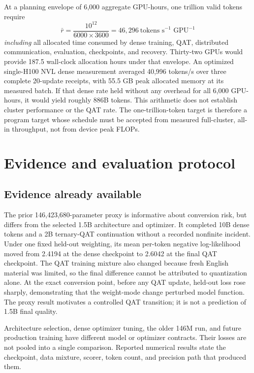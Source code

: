 \documentclass[11pt]{article}
\begin{document}
At a planning envelope of 6,000 aggregate GPU-hours, one trillion valid
tokens require
\begin{equation}
\bar r=\frac{10^{12}}{6000\times3600}
=46{,}296\ \text{tokens s}^{-1}\text{ GPU}^{-1}
\end{equation}
\emph{including} all allocated time consumed by dense training, QAT,
distributed communication, evaluation, checkpoints, and recovery. Thirty-two
GPUs would provide 187.5 wall-clock allocation hours under that envelope.
An optimized single-H100 NVL dense measurement averaged 40,996 tokens/s
over three complete 20-update receipts, with 55.5 GB peak allocated memory
at its measured batch. If that dense rate held without any overhead for all
6,000 GPU-hours, it would yield roughly 886B tokens. This arithmetic does
not establish cluster performance or the QAT rate. The one-trillion-token
target is therefore a program target whose schedule must be accepted from
measured full-cluster, all-in throughput, not from device peak FLOPs.

\section{Evidence and evaluation protocol}

\subsection{Evidence already available}

The prior 146,423,680-parameter proxy is informative about conversion risk,
but differs from the selected 1.5B architecture and optimizer. It completed
10B dense tokens and a 2B ternary-QAT continuation without a recorded
nonfinite incident. Under one fixed held-out weighting, its mean per-token
negative log-likelihood moved from 2.4194 at the dense checkpoint to 2.6042
at the final QAT checkpoint. The QAT training mixture also changed because
fresh English material was limited, so the final difference cannot be
attributed to quantization alone. At the exact conversion point, before any
QAT update, held-out loss rose sharply, demonstrating that the weight-mode
change perturbed model function. The proxy result motivates a controlled
QAT transition; it is not a prediction of 1.5B final quality.

Architecture selection, dense optimizer tuning, the older 146M run, and
future production training have different model or optimizer contracts.
Their losses are not pooled into a single comparison. Reported numerical
results state the checkpoint, data mixture, scorer, token count, and
precision path that produced them.
\end{document}
